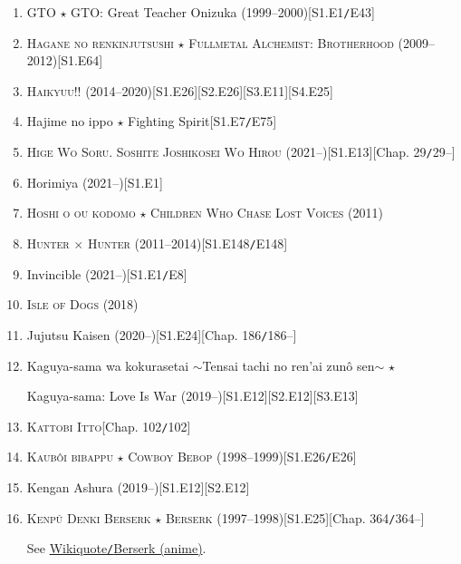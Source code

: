\documentclass[oneside]{book}
\numberwithin{equation}{section}
\begin{document}
\begin{enumerate}
    \item GTO $\star$ GTO: Great Teacher Onizuka (1999--2000)\hfill[S1.E1\texttt{/}E43]
    \item \textsc{Hagane no renkinjutsushi $\star$ Fullmetal Alchemist: Brotherhood} (2009--2012)\hfill[S1.E64]
    \item \textsc{Haikyuu!!} (2014--2020)\hfill[S1.E26][S2.E26][S3.E11][S4.E25]
    \item Hajime no ippo $\star$ Fighting Spirit\hfill[S1.E7\texttt{/}E75]
    \item \textsc{Hige Wo Soru. Soshite Joshikosei Wo Hirou} (2021--)\hfill[S1.E13][Chap. 29\texttt{/}29--]
    \item Horimiya (2021--)\hfill[S1.E1]
    \item \textsc{Hoshi o ou kodomo $\star$ Children Who Chase Lost Voices} (2011)
    \item \textsc{Hunter $\times$ Hunter} (2011--2014)\hfill[S1.E148\texttt{/}E148]
    \item Invincible (2021--)\hfill[S1.E1\texttt{/}E8]
    \item \textsc{Isle of Dogs} (2018)
    \item Jujutsu Kaisen (2020--)\hfill[S1.E24][Chap. 186\texttt{/}186--]
    \item Kaguya-sama wa kokurasetai $\sim$Tensai tachi no ren'ai zun\^o sen$\sim$ $\star$
    
    Kaguya-sama: Love Is War (2019--)\hfill[S1.E12][S2.E12][S3.E13]
    \item \textsc{Kattobi Itto}\hfill[Chap. 102\texttt{/}102]
    \item \textsc{Kaub\^oi bibappu $\star$ Cowboy Bebop} (1998--1999)\hfill[S1.E26\texttt{/}E26]
    \item Kengan Ashura (2019--)\hfill[S1.E12][S2.E12]
    \item \textsc{Kenp\^u Denki Berserk $\star$ Berserk} (1997--1998)\hfill[S1.E25][Chap. 364\texttt{/}364--]
    
    See \href{https://en.wikiquote.org/wiki/Berserk_(anime)}{Wikiquote\texttt{/}Berserk (anime)}.
    

\end{enumerate}
\end{document}
